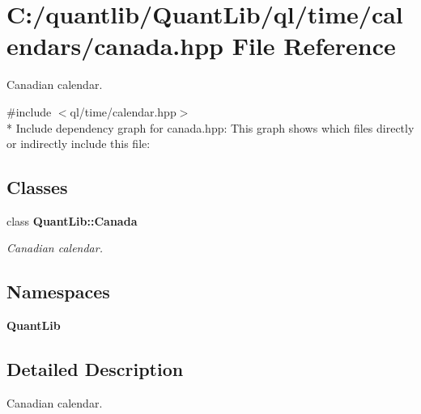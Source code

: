 \section{C\+:/quantlib/\+Quant\+Lib/ql/time/calendars/canada.hpp File Reference}
\label{canada_8hpp}


Canadian calendar.  


{\ttfamily \#include $<$ql/time/calendar.\+hpp$>$}\\*
Include dependency graph for canada.\+hpp\+:
This graph shows which files directly or indirectly include this file\+:
\subsection*{Classes}
\begin{DoxyCompactItemize}
\item 
class {\bf Quant\+Lib\+::\+Canada}
\begin{DoxyCompactList}\small\item\em Canadian calendar. \end{DoxyCompactList}\end{DoxyCompactItemize}
\subsection*{Namespaces}
\begin{DoxyCompactItemize}
\item 
 {\bf Quant\+Lib}
\end{DoxyCompactItemize}


\subsection{Detailed Description}
Canadian calendar. 

